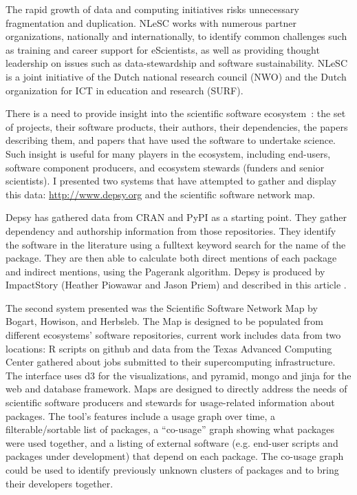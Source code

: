 \documentclass[a4paper,UKenglish]{dagrep}
\begin{document}
The rapid growth of data and computing initiatives risks unnecessary
fragmentation and duplication. NLeSC works with numerous partner
organizations, nationally and internationally, to identify common
challenges such as training and career support for eScientists, as
well as providing thought leadership on issues such as
data-stewardship and software sustainability. NLeSC is a joint
initiative of the Dutch national research council (NWO) and the Dutch
organization for ICT in education and research (SURF).




  
There is a need to provide insight into the scientific software ecosystem~\cite{bogart_mapping_2015}: the set of projects, their software products, their authors, their dependencies, the papers describing them, and papers that have used the software to undertake science.  Such insight is useful for many players in the ecosystem, including end-users, software component producers, and ecosystem stewards (funders and senior scientists). I presented two systems that have attempted to gather and display this data: \href{depsy.org}{http://www.depsy.org} and the scientific software network map.

Depsy has gathered data from CRAN and PyPI as a starting point. They gather dependency and authorship information from those repositories. They identify the software in the literature using a fulltext keyword search for the name of the package. They are then able to calculate both direct mentions of each package and indirect mentions, using the Pagerank algorithm.  Depsy is produced by ImpactStory (Heather Piowawar and Jason Priem) and described in this article \cite{singh_chawla_unsung_2016}.

The second system presented was the Scientific Software Network Map by Bogart, Howison, and Herbsleb. The Map is designed to be populated from different ecosystems' software repositories, current work includes data from two locations: R scripts on github and data from the Texas Advanced Computing Center gathered about jobs submitted to their supercomputing infrastructure.  The interface uses d3 for the visualizations, and pyramid, mongo and jinja for the web and database framework. Maps are designed to directly address the needs of scientific software producers and stewards for usage-related information about packages. The tool's features include a usage graph over time, a filterable/sortable list of packages, a ``co-usage'' graph showing what packages were used together, and a listing of external software (e.g. end-user scripts and packages under development) that depend on each package. The co-usage graph could be used to identify previously unknown clusters of packages and to bring their developers together.
  
\end{document}
